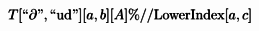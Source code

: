 \documentclass{article}
\begin{document}
\begin{doublespace}
}\left[\varepsilon _{\alpha }^{\alpha }\right]\right] \delta \left[h_{\lambda \sigma }^{\lambda \sigma }\right]-h_{\alpha \tau }^{\alpha \tau } \left(h_{\lambda \sigma }^{\lambda \sigma } \underline{\partial }_{\lambda }\left[\underline{\partial }^{\sigma }\left[\underline{\partial }_{\tau }\left[\delta \left[\varepsilon _{\alpha }^{\alpha }\right]\right]\right]\right]+\underline{\partial }_{\lambda }\left[\underline{\partial }^{\sigma }\left[\underline{\partial }_{\tau }\left[\varepsilon _{\alpha }^{\alpha }\right]\right]\right] \delta \left[h_{\lambda \sigma }^{\lambda \sigma }\right]\right)-\underline{\partial }_{\tau }\left[\varepsilon _{\sigma }^{\sigma }\right] \underline{\partial }_{\lambda }\left[\underline{\partial }^{\sigma }\left[h_{\alpha \alpha }^{\alpha \alpha }\right]\right] \delta \left[h_{\lambda \tau }^{\lambda \tau }\right]-h_{\lambda \sigma }^{\lambda \sigma } \left(h_{\sigma \alpha }^{\sigma \alpha } \underline{\partial }_{\lambda }\left[\underline{\partial }^{\sigma }\left[\underline{\partial }_{\sigma }\left[\delta \left[\varepsilon _{\alpha }^{\alpha }\right]\right]\right]\right]+\underline{\partial }_{\lambda }\left[\underline{\partial }^{\sigma }\left[\underline{\partial }_{\sigma }\left[\varepsilon _{\alpha }^{\alpha }\right]\right]\right] \delta \left[h_{\sigma \alpha }^{\sigma \alpha }\right]\right)-\underline{\partial }_{\sigma }\left[\varepsilon _{\lambda }^{\lambda }\right] \underline{\partial }_{\lambda }\left[\underline{\partial }^{\sigma }\left[h_{\alpha \alpha }^{\alpha \alpha }\right]\right] \delta \left[h_{\sigma \sigma }^{\sigma \sigma }\right]\right\}\)
\end{doublespace}

\begin{doublespace}
\noindent\(\pmb{T[\text{{``}$\partial ${''}},\text{{``}ud{''}}][a,b][A]}\\
\pmb{\%\text{//}\text{LowerIndex}[a,c]}\)
\end{doublespace}
\end{document}
